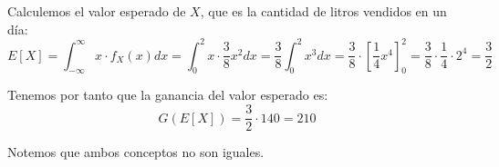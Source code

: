 \begin{ejercicio}
\begin{observacion}
        Calculemos el valor esperado de $X$, que es la cantidad de litros vendidos en un día:
        \begin{equation*}
            E[X] = \int_{-\infty}^{\infty}x\cdot f_X(x)dx = \int_{0}^{2}x\cdot \frac{3}{8}x^2dx = \frac{3}{8}\int_{0}^{2}x^3dx = \frac{3}{8}\cdot \left[\frac{1}{4}x^4\right]_{0}^{2} = \frac{3}{8}\cdot \frac{1}{4}\cdot 2^4 = \dfrac{3}{2}
        \end{equation*}

        Tenemos por tanto que la ganancia del valor esperado es:
        \begin{equation*}
            G(E[X]) = \dfrac{3}{2}\cdot 140 = 210
        \end{equation*}

        Notemos que ambos conceptos no son iguales.
    \end{observacion}
\end{ejercicio}